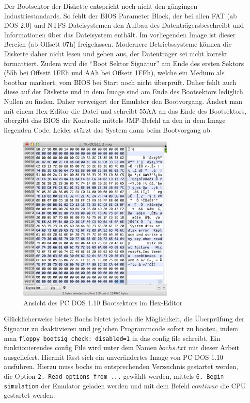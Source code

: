 	Der Bootsektor der Diskette entspricht noch nicht den gängingen Industriestandards.
	So fehlt der BIOS Parameter Block, der bei allen FAT (ab DOS 2.0) und NTFS Dateisystemen den Aufbau des Datenträgersbeschreibt und Informationen über das Dateisystem enthält. Im vorliegenden Image ist dieser Bereich (ab Offsett 07h) freigelassen.
	Modernere Betriebssysteme können die Diskette daher nicht lesen und geben aus, der Datenträger sei nicht korrekt formattiert. 
	Zudem wird die "`Boot Sektor Signatur"' am Ende des ersten Sektors (55h bei Offsett 1FEh und AAh bei Offsett 1FFh), welche ein Medium als bootbar markiert, vom BIOS bei Start noch nicht überprüft. \cite{IBMTechRef} Daher fehlt auch diese auf der Diskette und in dem Image sind am Ende des Bootsektors lediglich Nullen zu finden.
	Daher verweigert der Emulator den Bootvorgang.
	Ändert man mit einem Hex-Editor die Datei und schreibt 55AA an das Ende des Bootsektors, übergibt das BIOS die Kontrolle mittels JMP-Befehl an den in dem Image liegenden Code. Leider stürzt das System dann beim Bootvorgang ab.

	\begin{figure}[h]
		\begin{center}
			\includegraphics[width=0.7\textwidth]{img/DOS110hex}
			\caption{Ansicht des PC DOS 1.10 Bootsektors im Hex-Editor}
			\label{fig:screenshot-hexeditor110}
		\end{center}
	\end{figure}

	Glücklicherweise bietet Bochs bietet jedoch die Möglichkeit, die Überprüfung der Signatur zu deaktivieren und jeglichen Programmcode sofort zu booten, indem man \lstinline{floppy_bootsig_check: disabled=1} in das config file schreibt.
	Ein funktionierendes config File wird unter dem Namen $bochs.txt$ mit dieser Arbeit ausgeliefert.
	Hiermit lässt sich ein unverändertes Image von PC DOS 1.10 ausführen.
	Hierzu muss bochs im entsprechenden Verzeichnis gestartet werden, die Option \lstinline{2. Read options from ...} gewählt werden, mittels \lstinline{6. Begin simulation} der Emulator geladen werden und mit dem Befehl $continue$ die CPU gestartet werden.

